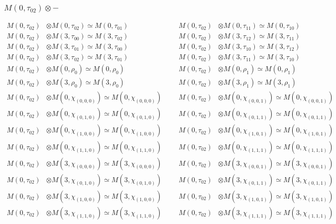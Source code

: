 \subsubsection{$ M(0,\tau_{02})\otimes -$}
\begin{align*}
M(0,\tau_{02}) &\otimes M(0,\tau_{02}) \simeq M(0,\tau_{01}) &&& M(0,\tau_{02}) &\otimes M(0,\tau_{11}) \simeq M(0,\tau_{10})\\
M(0,\tau_{02}) &\otimes M(3,\tau_{00}) \simeq M(3,\tau_{02}) &&& M(0,\tau_{02}) &\otimes M(3,\tau_{12}) \simeq M(3,\tau_{11})\\
M(0,\tau_{02}) &\otimes M(3,\tau_{01}) \simeq M(3,\tau_{00}) &&& M(0,\tau_{02}) &\otimes M(3,\tau_{10}) \simeq M(3,\tau_{12})\\
M(0,\tau_{02}) &\otimes M(3,\tau_{02}) \simeq M(3,\tau_{01}) &&& M(0,\tau_{02}) &\otimes M(3,\tau_{11}) \simeq M(3,\tau_{10})\\
M(0,\tau_{02}) &\otimes M(0,\rho_{0}) \simeq M(0,\rho_{0}) &&& M(0,\tau_{02}) &\otimes M(0,\rho_{1}) \simeq M(0,\rho_{1})\\
M(0,\tau_{02}) &\otimes M(3,\rho_{0}) \simeq M(3,\rho_{0}) &&& M(0,\tau_{02}) &\otimes M(3,\rho_{1}) \simeq M(3,\rho_{1})\\
M(0,\tau_{02}) &\otimes M(0,\chi_{(0,0,0)}) \simeq M(0,\chi_{(0,0,0)}) &&& M(0,\tau_{02}) &\otimes M(0,\chi_{(0,0,1)}) \simeq M(0,\chi_{(0,0,1)})\\
M(0,\tau_{02}) &\otimes M(0,\chi_{(0,1,0)}) \simeq M(0,\chi_{(0,1,0)}) &&& M(0,\tau_{02}) &\otimes M(0,\chi_{(0,1,1)}) \simeq M(0,\chi_{(0,1,1)})\\
M(0,\tau_{02}) &\otimes M(0,\chi_{(1,0,0)}) \simeq M(0,\chi_{(1,0,0)}) &&& M(0,\tau_{02}) &\otimes M(0,\chi_{(1,0,1)}) \simeq M(0,\chi_{(1,0,1)})\\
M(0,\tau_{02}) &\otimes M(0,\chi_{(1,1,0)}) \simeq M(0,\chi_{(1,1,0)}) &&& M(0,\tau_{02}) &\otimes M(0,\chi_{(1,1,1)}) \simeq M(0,\chi_{(1,1,1)})\\
M(0,\tau_{02}) &\otimes M(3,\chi_{(0,0,0)}) \simeq M(3,\chi_{(0,0,0)}) &&& M(0,\tau_{02}) &\otimes M(3,\chi_{(0,0,1)}) \simeq M(3,\chi_{(0,0,1)})\\
M(0,\tau_{02}) &\otimes M(3,\chi_{(0,1,0)}) \simeq M(3,\chi_{(0,1,0)}) &&& M(0,\tau_{02}) &\otimes M(3,\chi_{(0,1,1)}) \simeq M(3,\chi_{(0,1,1)})\\
M(0,\tau_{02}) &\otimes M(3,\chi_{(1,0,0)}) \simeq M(3,\chi_{(1,0,0)}) &&& M(0,\tau_{02}) &\otimes M(3,\chi_{(1,0,1)}) \simeq M(3,\chi_{(1,0,1)})\\
M(0,\tau_{02}) &\otimes M(3,\chi_{(1,1,0)}) \simeq M(3,\chi_{(1,1,0)}) &&& M(0,\tau_{02}) &\otimes M(3,\chi_{(1,1,1)}) \simeq M(3,\chi_{(1,1,1)})\\

\end{align*}
